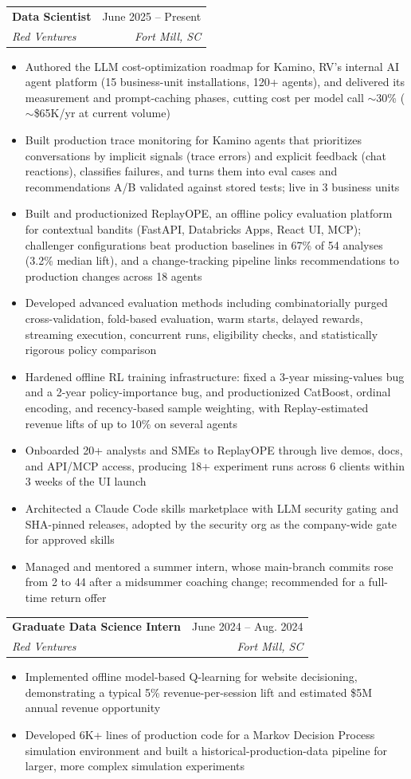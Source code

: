 \documentclass[letterpaper,11pt]{article}
\makeatletter
\newcommand{\resumeItem}[1]{
  \item\small{
    {#1 \vspace{-2pt}}
  }
}
\newcommand{\resumeSubheading}[4]{
  \vspace{-2pt}\item
    \begin{tabular*}{0.97\textwidth}[t]{l@{\extracolsep{\fill}}r}
      \textbf{#1} & #2 \\
      \textit{\small#3} & \textit{\small #4} \\
    \end{tabular*}\vspace{-7pt}
}
\newcommand{\resumeItemListStart}{\begin{itemize}}
\newcommand{\resumeItemListEnd}{\end{itemize}\vspace{-5pt}}
\makeatother
\begin{document}
    \resumeSubheading
      {Data Scientist}{June 2025 -- Present}
      {Red Ventures}{Fort Mill, SC}
      \resumeItemListStart
      \resumeItem{
          Authored the LLM cost-optimization roadmap for Kamino, RV's internal AI agent platform (15 business-unit installations, 120+ agents), and delivered its measurement and prompt-caching phases, cutting cost per model call $\sim$30\% ($\sim$\$65K/yr at current volume)
      }
      \resumeItem{
          Built production trace monitoring for Kamino agents that prioritizes conversations by implicit signals (trace errors) and explicit feedback (chat reactions), classifies failures, and turns them into eval cases and recommendations A/B validated against stored tests; live in 3 business units
      }
      \resumeItem{
          Built and productionized ReplayOPE, an offline policy evaluation platform for contextual bandits (FastAPI, Databricks Apps, React UI, MCP); challenger configurations beat production baselines in 67\% of 54 analyses (3.2\% median lift), and a change-tracking pipeline links recommendations to production changes across 18 agents
      }
      \resumeItem{
          Developed advanced evaluation methods including combinatorially purged cross-validation, fold-based evaluation, warm starts, delayed rewards, streaming execution, concurrent runs, eligibility checks, and statistically rigorous policy comparison
      }
      \resumeItem{
          Hardened offline RL training infrastructure: fixed a 3-year missing-values bug and a 2-year policy-importance bug, and productionized CatBoost, ordinal encoding, and recency-based sample weighting, with Replay-estimated revenue lifts of up to 10\% on several agents
      }
      \resumeItem{
          Onboarded 20+ analysts and SMEs to ReplayOPE through live demos, docs, and API/MCP access, producing 18+ experiment runs across 6 clients within 3 weeks of the UI launch
      }
      \resumeItem{
          Architected a Claude Code skills marketplace with LLM security gating and SHA-pinned releases, adopted by the security org as the company-wide gate for approved skills
      }
      \resumeItem{
          Managed and mentored a summer intern, whose main-branch commits rose from 2 to 44 after a midsummer coaching change; recommended for a full-time return offer
      }
      \resumeItemListEnd

    \resumeSubheading
      {Graduate Data Science Intern}{June 2024 -- Aug. 2024}
      {Red Ventures}{Fort Mill, SC}
      \resumeItemListStart
          \resumeItem{
              Implemented offline model-based Q-learning for website decisioning, demonstrating a typical 5\% revenue-per-session lift and estimated \$5M annual revenue opportunity
          }
          \resumeItem{
              Developed 6K+ lines of production code for a Markov Decision Process simulation environment and built a historical-production-data pipeline for larger, more complex simulation experiments
          }
      \resumeItemListEnd
\end{document}
